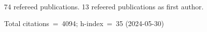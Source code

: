 74 refereed publications. 13 refeered publications as first author.

Total citations~=~4094; h-index~=~35 (2024-05-30)